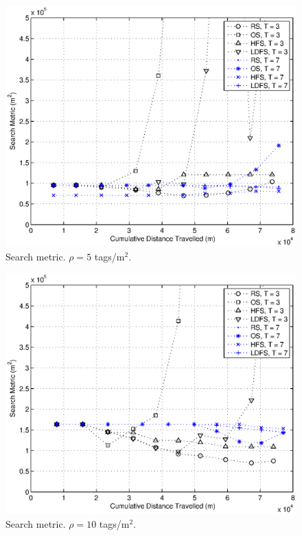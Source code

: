 \begin{figure}
\centering
\includegraphics[width=5in]{Chapter_2_Figures/search_dense05.eps}
\caption{Search metric. $\rho = 5$ tags/m$^2$.}
\label{Figure: search_dense05.eps}
\end{figure}
\begin{figure}
\centering
\includegraphics[width=5in]{Chapter_2_Figures/search_dense10.eps}
\caption{Search metric. $\rho = 10$ tags/m$^2$.}
\label{Figure: search_dense10.eps}
\end{figure}
\clearpage

